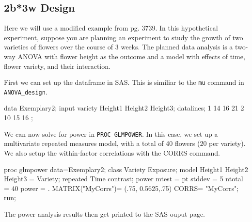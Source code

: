 \documentclass[
]{book}
\newenvironment{Shaded}{\begin{snugshade}}{\end{snugshade}}
\newcommand{\DecValTok}[1]{\textcolor[rgb]{0.00,0.00,0.81}{#1}}
\newcommand{\FloatTok}[1]{\textcolor[rgb]{0.00,0.00,0.81}{#1}}
\newcommand{\FunctionTok}[1]{\textcolor[rgb]{0.00,0.00,0.00}{#1}}
\newcommand{\NormalTok}[1]{#1}
\newcommand{\OtherTok}[1]{\textcolor[rgb]{0.56,0.35,0.01}{#1}}
\newcommand{\StringTok}[1]{\textcolor[rgb]{0.31,0.60,0.02}{#1}}
\begin{document}
\hypertarget{b3w-design}{%
\subsection{2b*3w Design}\label{b3w-design}}

Here we will use a modified example from \citet{SASglmpower} pg. 3739. In this hypothetical experiment, suppose you are planning an experiment to study the growth of two varieties of flowers over the course of 3 weeks. The planned data analysis is a two-way ANOVA with flower height as the outcome and a model with effects of time, flower variety, and their interaction.

First we can set up the dataframe in SAS. This is similiar to the \texttt{mu} command in \texttt{ANOVA\_design}.

\begin{Shaded}
\begin{Highlighting}[]
\NormalTok{data Exemplary2;}
\NormalTok{input variety Height1 Height2 Height3;}
\NormalTok{datalines;}
\DecValTok{1} \DecValTok{14} \DecValTok{16} \DecValTok{21}
\DecValTok{2} \DecValTok{10} \DecValTok{15} \DecValTok{16}
\NormalTok{;}
\end{Highlighting}
\end{Shaded}

We can now solve for power in \texttt{PROC\ GLMPOWER}. In this case, we set up a multivariate repeated measures model, with a total of 40 flowers (20 per variety). We also setup the within-factor correlations with the CORRS command.

\begin{Shaded}
\begin{Highlighting}[]
\NormalTok{proc glmpower data}\OtherTok{=}\NormalTok{Exemplary2;}
\NormalTok{class Variety Exposure;}
\NormalTok{model Height1 Height2 Height3 }\OtherTok{=}\NormalTok{ Variety;}
\NormalTok{repeated Time contrast;}
\NormalTok{power}
\NormalTok{mtest }\OtherTok{=}\NormalTok{ pt}
\NormalTok{stddev }\OtherTok{=} \DecValTok{5}
\NormalTok{ntotal }\OtherTok{=} \DecValTok{40}
\NormalTok{power }\OtherTok{=}\NormalTok{ .}
\FunctionTok{MATRIX}\NormalTok{(}\StringTok{"MyCorrs"}\NormalTok{)}\OtherTok{=}\NormalTok{ (.}\DecValTok{75}\NormalTok{,}
                    \FloatTok{0.5625}\NormalTok{,.}\DecValTok{75}\NormalTok{)}
\NormalTok{CORRS}\OtherTok{=} \StringTok{"MyCorrs"}\NormalTok{;}
\NormalTok{run;}
\end{Highlighting}
\end{Shaded}

The power analysis results then get printed to the SAS ouput page.
\end{document}
